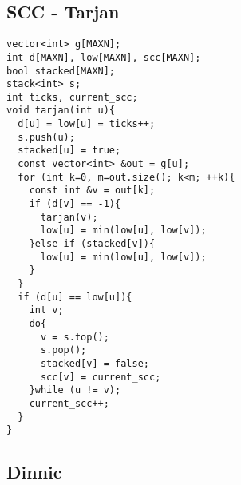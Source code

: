 \documentclass[10pt,letterpaper,twocolumn,twosided]{article}
\begin{document}
\subsection{SCC - Tarjan}

\begin{lstlisting}
vector<int> g[MAXN];
int d[MAXN], low[MAXN], scc[MAXN];
bool stacked[MAXN];
stack<int> s;
int ticks, current_scc;
void tarjan(int u){
  d[u] = low[u] = ticks++;
  s.push(u);
  stacked[u] = true;
  const vector<int> &out = g[u];
  for (int k=0, m=out.size(); k<m; ++k){
    const int &v = out[k];
    if (d[v] == -1){
      tarjan(v);
      low[u] = min(low[u], low[v]);
    }else if (stacked[v]){
      low[u] = min(low[u], low[v]);
    }
  }
  if (d[u] == low[u]){
    int v;
    do{
      v = s.top();
      s.pop();
      stacked[v] = false;
      scc[v] = current_scc;
    }while (u != v);
    current_scc++;
  }
}
\end{lstlisting}


\subsection{Dinnic}
\end{document}
